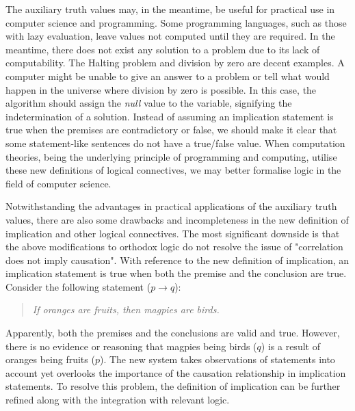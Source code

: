 \documentclass{article}
\begin{document}
The auxiliary truth values may, in the meantime, be useful for practical use in computer science and programming. Some programming languages, such as those with lazy evaluation, leave values not computed until they are required. In the meantime, there does not exist any solution to a problem due to its lack of computability. The Halting problem and division by zero are decent examples. A computer might be unable to give an answer to a problem or tell what would happen in the universe where division by zero is possible. In this case, the algorithm should assign the \textit{null} value to the variable, signifying the indetermination of a solution. Instead of assuming an implication statement is true when the premises are contradictory or false, we should make it clear that some statement-like sentences do not have a true/false value. When computation theories, being the underlying principle of programming and computing, utilise these new definitions of logical connectives, we may better formalise logic in the field of computer science.

\bigskip

Notwithstanding the advantages in practical applications of the auxiliary truth values, there are also some drawbacks and incompleteness in the new definition of implication and other logical connectives. The most significant downside is that the above modifications to orthodox logic do not resolve the issue of "correlation does not imply causation". With reference to the new definition of implication, an implication statement is true when both the premise and the conclusion are true. Consider the following statement ($p \to q$):

\begin{quote}
    \textit{If oranges are fruits, then magpies are birds.}
\end{quote}

Apparently, both the premises and the conclusions are valid and true. However, there is no evidence or reasoning that magpies being birds ($q$) is a result of oranges being fruits ($p$). The new system takes observations of statements into account yet overlooks the importance of the causation relationship in implication statements. To resolve this problem, the definition of implication can be further refined along with the integration with relevant logic.

\bigskip
\end{document}
